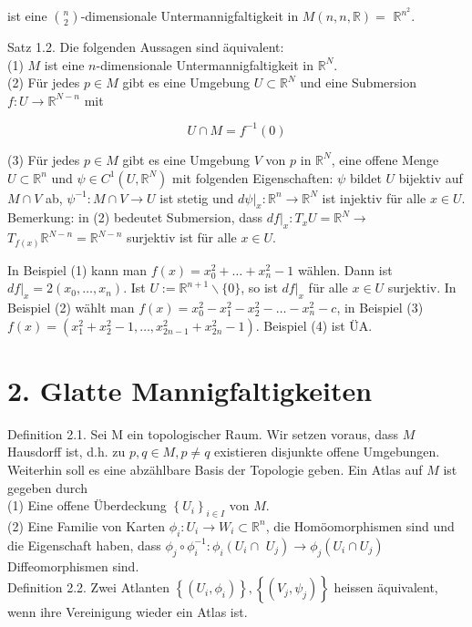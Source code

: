 \documentclass[10pt]{article}
\begin{document}
ist eine $\binom{n}{2}$-dimensionale Untermannigfaltigkeit in $M(n, n, \mathbb{R})=$ $\mathbb{R}^{n^{2}}$.

Satz 1.2. Die folgenden Aussagen sind äquivalent:\\
(1) $M$ ist eine $n$-dimensionale Untermannigfaltigkeit in $\mathbb{R}^{N}$.\\
(2) Für jedes $p \in M$ gibt es eine Umgebung $U \subset \mathbb{R}^{N}$ und eine Submersion $f: U \rightarrow \mathbb{R}^{N-n}$ mit

$$
U \cap M=f^{-1}(0)
$$

(3) Für jedes $p \in M$ gibt es eine Umgebung $V$ von $p$ in $\mathbb{R}^{N}$, eine offene Menge $U \subset \mathbb{R}^{n}$ und $\psi \in C^{1}\left(U, \mathbb{R}^{N}\right)$ mit folgenden Eigenschaften: $\psi$ bildet $U$ bijektiv auf $M \cap V$ ab, $\psi^{-1}: M \cap V \rightarrow U$ ist stetig und $\left.d \psi\right|_{x}: \mathbb{R}^{n} \rightarrow \mathbb{R}^{N}$ ist injektiv für alle $x \in U$.\\
Bemerkung: in (2) bedeutet Submersion, dass $\left.d f\right|_{x}: T_{x} U=\mathbb{R}^{N} \rightarrow$ $T_{f(x)} \mathbb{R}^{N-n}=\mathbb{R}^{N-n}$ surjektiv ist für alle $x \in U$.

In Beispiel (1) kann man $f(x)=x_{0}^{2}+\ldots+x_{n}^{2}-1$ wählen. Dann ist $\left.d f\right|_{x}=2\left(x_{0}, \ldots, x_{n}\right)$. Ist $U:=\mathbb{R}^{n+1} \backslash\{0\}$, so ist $\left.d f\right|_{x}$ für alle $x \in U$ surjektiv. In Beispiel (2) wählt man $f(x)=x_{0}^{2}-x_{1}^{2}-x_{2}^{2}-\ldots-x_{n}^{2}-c$, in Beispiel (3) $f(x)=\left(x_{1}^{2}+x_{2}^{2}-1, \ldots, x_{2 n-1}^{2}+x_{2 n}^{2}-1\right)$. Beispiel (4) ist ÜA.

\section*{2. Glatte Mannigfaltigkeiten}
Definition 2.1. Sei M ein topologischer Raum. Wir setzen voraus, dass $M$ Hausdorff ist, d.h. zu $p, q \in M, p \neq q$ existieren disjunkte offene Umgebungen. Weiterhin soll es eine abzählbare Basis der Topologie geben. Ein Atlas auf $M$ ist gegeben durch\\
(1) Eine offene Überdeckung $\left\{U_{i}\right\}_{i \in I}$ von $M$.\\
(2) Eine Familie von Karten $\phi_{i}: U_{i} \rightarrow W_{i} \subset \mathbb{R}^{n}$, die Homöomorphismen sind und die Eigenschaft haben, dass $\phi_{j} \circ \phi_{i}^{-1}: \phi_{i}\left(U_{i} \cap\right.$ $\left.U_{j}\right) \rightarrow \phi_{j}\left(U_{i} \cap U_{j}\right)$ Diffeomorphismen sind.\\
Definition 2.2. Zwei Atlanten $\left\{\left(U_{i}, \phi_{i}\right)\right\},\left\{\left(V_{j}, \psi_{j}\right)\right\}$ heissen äquivalent, wenn ihre Vereinigung wieder ein Atlas ist.
\end{document}
